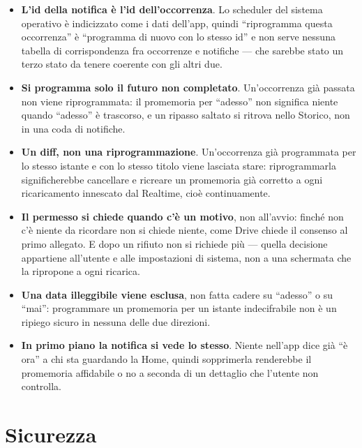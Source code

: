 \documentclass[11pt,a4paper]{report}
\begin{document}
\begin{itemize}[nosep]
  \item \textbf{L'id della notifica \`e l'id dell'occorrenza}. Lo scheduler del
        sistema operativo \`e indicizzato come i dati dell'app, quindi
        ``riprogramma questa occorrenza'' \`e ``programma di nuovo con lo
        stesso id'' e non serve nessuna tabella di corrispondenza fra
        occorrenze e notifiche --- che sarebbe stato un terzo stato da tenere
        coerente con gli altri due.
  \item \textbf{Si programma solo il futuro non completato}. Un'occorrenza gi\`a
        passata non viene riprogrammata: il promemoria per ``adesso'' non
        significa niente quando ``adesso'' \`e trascorso, e un ripasso saltato
        si ritrova nello Storico, non in una coda di notifiche.
  \item \textbf{Un diff, non una riprogrammazione}. Un'occorrenza gi\`a
        programmata per lo stesso istante e con lo stesso titolo viene lasciata
        stare: riprogrammarla significherebbe cancellare e ricreare un
        promemoria gi\`a corretto a ogni ricaricamento innescato dal Realtime,
        cio\`e continuamente.
  \item \textbf{Il permesso si chiede quando c'\`e un motivo}, non all'avvio:
        finch\'e non c'\`e niente da ricordare non si chiede niente, come Drive
        chiede il consenso al primo allegato. E dopo un rifiuto non si richiede
        pi\`u --- quella decisione appartiene all'utente e alle impostazioni di
        sistema, non a una schermata che la ripropone a ogni ricarica.
  \item \textbf{Una data illeggibile viene esclusa}, non fatta cadere su
        ``adesso'' o su ``mai'': programmare un promemoria per un istante
        indecifrabile non \`e un ripiego sicuro in nessuna delle due direzioni.
  \item \textbf{In primo piano la notifica si vede lo stesso}. Niente
        nell'app dice gi\`a ``\`e ora'' a chi sta guardando la Home, quindi
        sopprimerla renderebbe il promemoria affidabile o no a seconda di un
        dettaglio che l'utente non controlla.
\end{itemize}

\chapter{Sicurezza}
\end{document}

